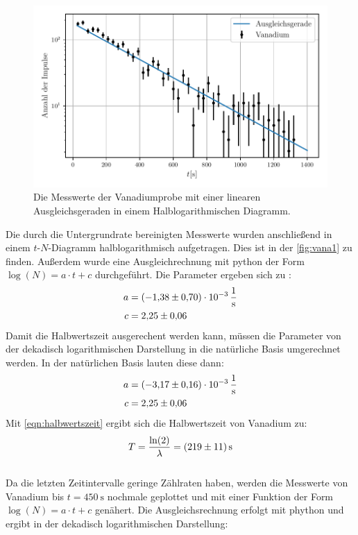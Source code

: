 \begin{figure}
  \centering
  \includegraphics{build/vanadium.pdf}
  \caption{Die Messwerte der Vanadiumprobe mit einer linearen Ausgleichsgeraden in einem Halblogarithmischen Diagramm.}
  \label{fig:vana1}
\end{figure}
Die durch die Untergrundrate bereinigten Messwerte wurden anschließend in einem $t$-$N$-Diagramm halblogarithmisch aufgetragen.
Dies ist in der \autoref{fig:vana1} zu finden. 
Außerdem wurde eine Ausgleichrechnung mit python der Form $\log(N) = a\cdot t + c$ durchgeführt.
Die Parameter ergeben sich zu :
\begin{align*}
  a &= \SI{-1.38(70)e-3}{\per\second}\\
  c &= \num{2.25\pm 0.06}
\end{align*}
Damit die Halbwertszeit ausgerechent werden kann, müssen die Parameter von der dekadisch logarithmischen Darstellung in die natürliche Basis umgerechnet werden.
In der natürlichen Basis lauten diese dann:
\begin{align*}
  a &= \SI{-3.17(16)e-3}{\per\second}\\
  c &= \num{2.25 \pm 0.06}
\end{align*}
Mit \eqref{eqn:halbwertszeit} ergibt sich die Halbwertszeit von Vanadium zu:
\begin{equation*}
  T = \frac{\ln(2)}{\lambda} = \SI{219\pm 11}{\second}
\end{equation*}
\\
Da die letzten Zeitintervalle geringe Zählraten haben, werden die Messwerte von Vanadium bis $t=\SI{450}{\second}$ nochmale geplottet und mit einer Funktion der Form $\log(N) = a\cdot t +c $ genähert.
Die Ausgleichsrechnung erfolgt mit phython und ergibt in der dekadisch logarithmischen Darstellung:
